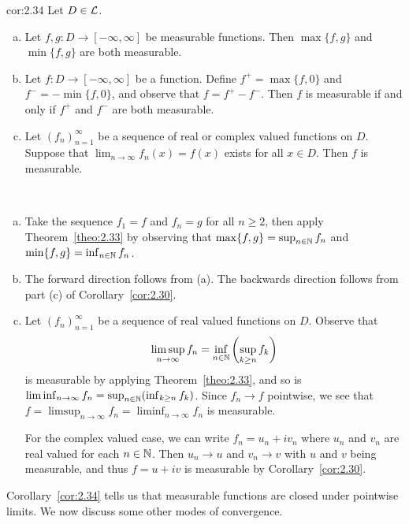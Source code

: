 \begin{cor}{cor:2.34}
    Let $D \in {\cal L}$. 
    \begin{enumerate}[(a)]
        \item Let $f, g : D \to [-\infty, \infty]$ be measurable 
        functions. Then $\max\{f, g\}$ and $\min\{f, g\}$ are 
        both measurable. 
        \item Let $f : D \to [-\infty, \infty]$ be a function. Define 
        $f^+ = \max\{f, 0\}$ and $f^- = -\min\{f, 0\}$, and observe that 
        $f = f^+ - f^-$. Then $f$ is measurable if and only if $f^+$ and 
        $f^-$ are both measurable. 
        \item Let $(f_n)_{n=1}^\infty$ be a sequence of real or complex
        valued functions on $D$. Suppose that $\lim_{n\to\infty} 
        f_n(x) = f(x)$ exists for all $x \in D$. Then $f$ is measurable. 
    \end{enumerate}
\end{cor}
\begin{pf}~
    \begin{enumerate}[(a)]
        \item Take the sequence $f_1 = f$ and $f_n = g$ for all $n \geq 2$, 
        then apply Theorem~\ref{theo:2.33} by observing that 
        $\max\{f, g\} = \sup_{n\in\mathbb{N}} f_n$ and $\min\{f, g\} = 
        \inf_{n\in\mathbb{N}} f_n$. 
        \item The forward direction follows from (a). The backwards 
        direction follows from part (c) of Corollary~\ref{cor:2.30}. 
        \item Let $(f_n)_{n=1}^\infty$ be a sequence of real valued 
        functions on $D$. Observe that 
        \[ \limsup_{n\to\infty} f_n = \inf_{n\in\mathbb{N}} \left( \sup_{k\geq n}
        f_k \right) \] 
        is measurable by applying Theorem~\ref{theo:2.33}, and so is 
        $\liminf_{n\to\infty} f_n = \sup_{n\in\mathbb{N}} (\inf_{k\geq n} f_k)$. 
        Since $f_n \to f$ pointwise, we see that  $f = \limsup_{n\to\infty} f_n 
        = \liminf_{n\to\infty} f_n$ is measurable. 
        
        For the complex valued case, we can write $f_n = u_n + iv_n$ 
        where $u_n$ and $v_n$ are real valued for each $n \in \mathbb{N}$. 
        Then $u_n \to u$ and $v_n \to v$ with $u$ and $v$ being measurable, 
        and thus $f = u + iv$ is measurable by Corollary~\ref{cor:2.30}. \qedhere 
    \end{enumerate}
\end{pf}

Corollary~\ref{cor:2.34} tells us that measurable functions are closed under 
pointwise limits. We now discuss some other modes of convergence. 

